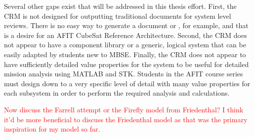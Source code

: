 Several other gaps exist that will be addressed in this thesis effort. First, the CRM is not designed for outputting traditional documents for system level reviews. There is no easy way to generate a  document or , for example, and that is a desire for an AFIT CubeSat Reference Architecture. Second, the CRM does not appear to have a component library or a generic, logical system that can be easily adapted by students new to MBSE. Finally, the CRM does not appear to have sufficiently detailed value properties for the system to be useful for detailed mission analysis using MATLAB and STK. Students in the AFIT course series must design down to a very specific level of detail with many value properties for each subsystem in order to perform the required analysis and calculations.


\textcolor{red}{Now discuss the Farrell attempt or the Firefly model from Friedenthal? I think it'd be more beneficial to discuss the Friedenthal model as that was the primary inspiration for my model so far.}